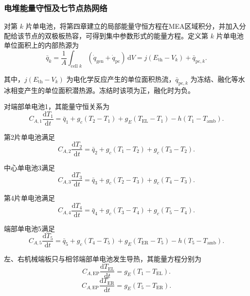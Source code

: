 \documentclass[bwprint]{gmcmthesis}
\numberwithin{figure}{section}
\begin{document}
\subsubsection{电堆能量守恒及七节点热网络}

\noindent 对第 \(k\) 片单电池，将第四章建立的局部能量守恒方程在MEA区域积分，并加入分配给该节点的双极板热容，可得到集中参数形式的能量方程。定义第 \(k\) 片单电池单位面积上的内部热源为
\begin{equation}
\bar{q}_k = \frac{1}{A} \int_{\text{cell } k} (\dot{q}_{\text{gen}} + \dot{q}_{\text{pc}}) \, \mathrm{d}V = j(E_{\text{th}} - V_k) + \bar{q}_{\text{pc},k}. \tag{5-24}
\end{equation}

\noindent 其中，\(j(E_{\text{th}} - V_k)\) 为电化学反应产生的单位面积热流，\(\bar{q}_{\text{pc},k}\) 为冻结、融化等水冰相变产生的单位面积潜热源。冻结时该项为正，融化时为负。

\noindent 对端部单电池1，其能量守恒关系为
\begin{equation}
C_{A,1} \frac{\mathrm{d}T_1}{\mathrm{d}t} = \bar{q}_1 + g_c(T_2 - T_1) + g_E(T_{\text{EL}} - T_1) - h(T_1 - T_{\text{amb}}). \tag{5-25}
\end{equation}

\noindent 第2片单电池满足
\begin{equation}
C_{A,2} \frac{\mathrm{d}T_2}{\mathrm{d}t} = \bar{q}_2 + g_c(T_1 - T_2) + g_c(T_3 - T_2). \tag{5-26}
\end{equation}

\noindent 中心单电池3满足
\begin{equation}
C_{A,3} \frac{\mathrm{d}T_3}{\mathrm{d}t} = \bar{q}_3 + g_c(T_2 - T_3) + g_c(T_4 - T_3). \tag{5-27}
\end{equation}

\noindent 第4片单电池满足
\begin{equation}
C_{A,4} \frac{\mathrm{d}T_4}{\mathrm{d}t} = \bar{q}_4 + g_c(T_3 - T_4) + g_c(T_5 - T_4). \tag{5-28}
\end{equation}

\noindent 端部单电池5满足
\begin{equation}
C_{A,5} \frac{\mathrm{d}T_5}{\mathrm{d}t} = \bar{q}_5 + g_c(T_4 - T_5) + g_E(T_{\text{ER}} - T_5) - h(T_5 - T_{\text{amb}}). \tag{5-29}
\end{equation}

\noindent 左、右机械端板只与相邻端部单电池发生导热，其能量方程分别为
\begin{equation}
C_{A,\text{EP}} \frac{\mathrm{d}T_{\text{EL}}}{\mathrm{d}t} = g_E(T_1 - T_{\text{EL}}). \tag{5-30}
\end{equation}
\begin{equation}
C_{A,\text{EP}} \frac{\mathrm{d}T_{\text{ER}}}{\mathrm{d}t} = g_E(T_5 - T_{\text{ER}}). \tag{5-31}
\end{equation}
\end{document}
